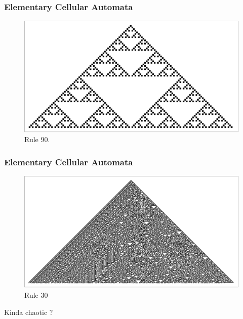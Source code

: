 \documentclass{beamer}
\begin{document}
\begin{frame}
    \frametitle{Elementary Cellular Automata}
    \begin{figure}
        \includegraphics[scale=0.4]{sier2.pdf}
        \caption{Rule 90.}
    \end{figure}
\end{frame}

\begin{frame}
    \frametitle{Elementary Cellular Automata}
    \begin{figure}
        \includegraphics[scale=0.39]{rule30.pdf}
        \caption{Rule 30}
    \end{figure}
    Kinda chaotic ?
\end{frame}
\end{document}

